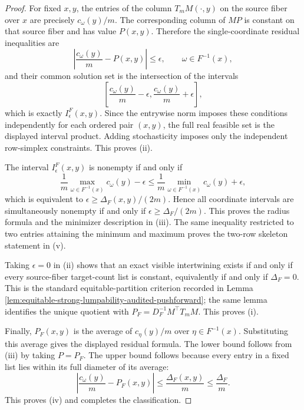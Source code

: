 \begin{proof}
For fixed \(x,y\), the entries of the column \(T_mM(\cdot,y)\) on the source fiber over \(x\) are precisely \(c_\omega(y)/m\).  The corresponding column of \(MP\) is constant on that source fiber and has value \(P(x,y)\).  Therefore the single-coordinate residual inequalities are
\[
\left|\frac{c_\omega(y)}{m}-P(x,y)\right|\le\epsilon,
\qquad \omega\in F^{-1}(x),
\]
and their common solution set is the intersection of the intervals
\[
\left[\frac{c_\omega(y)}{m}-\epsilon,
\frac{c_\omega(y)}{m}+\epsilon\right],
\]
which is exactly \(I_\epsilon^F(x,y)\).  Since the entrywise norm imposes these conditions independently for each ordered pair \((x,y)\), the full real feasible set is the displayed interval product.  Adding stochasticity imposes only the independent row-simplex constraints.  This proves \textup{(ii)}.

The interval \(I_\epsilon^F(x,y)\) is nonempty if and only if
\[
\frac{1}{m}\max_{\omega\in F^{-1}(x)}c_\omega(y)-\epsilon
\le
\frac{1}{m}\min_{\omega\in F^{-1}(x)}c_\omega(y)+\epsilon,
\]
which is equivalent to \(\epsilon\ge \Delta_F(x,y)/(2m)\).  Hence all coordinate intervals are simultaneously nonempty if and only if \(\epsilon\ge\Delta_F/(2m)\).  This proves the radius formula and the minimizer description in \textup{(iii)}.  The same inequality restricted to two entries attaining the minimum and maximum proves the two-row skeleton statement in \textup{(v)}.

Taking \(\epsilon=0\) in \textup{(ii)} shows that an exact visible intertwining exists if and only if every source-fiber target-count list is constant, equivalently if and only if \(\Delta_F=0\).  This is the standard equitable-partition criterion recorded in Lemma \ref{lem:equitable-strong-lumpability-audited-pushforward}; the same lemma identifies the unique quotient with \(P_F=D_F^{-1}M^\top T_mM\).  This proves \textup{(i)}.

Finally, \(P_F(x,y)\) is the average of \(c_\eta(y)/m\) over \(\eta\in F^{-1}(x)\).  Substituting this average gives the displayed residual formula.  The lower bound follows from \textup{(iii)} by taking \(P=P_F\).  The upper bound follows because every entry in a fixed list lies within its full diameter of its average:
\[
\left|\frac{c_\omega(y)}{m}-P_F(x,y)\right|
\le \frac{\Delta_F(x,y)}{m}
\le \frac{\Delta_F}{m}.
\]
This proves \textup{(iv)} and completes the classification. \qedhere
\end{proof}

